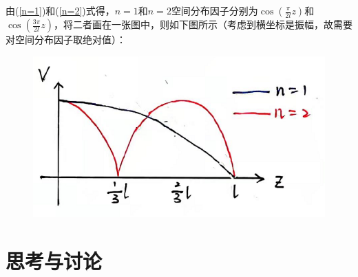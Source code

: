 \documentclass[UTF8]{ctexart}
\begin{document}
由(\ref{n=1})和(\ref{n=2})式得，$n=1$和$n=2$空间分布因子分别为$\cos(\frac{\pi}{2l}z)$和$\cos(\frac{3\pi}{2l}z)$，将二者画在一张图中，则如下图所示（考虑到横坐标是振幅，故需要对空间分布因子取绝对值）：

\begin{figure}[H]\begin{center}
    \includegraphics[scale=0.6]{19.PNG}
\end{center}\end{figure}







\section{思考与讨论}
\end{document}
